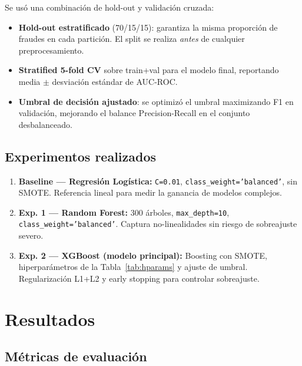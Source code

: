 \documentclass[10pt,twocolumn]{article}
\begin{document}
Se usó una combinación de hold-out y validación cruzada:

\begin{itemize}[leftmargin=*,topsep=2pt,itemsep=1pt]
  \item \textbf{Hold-out estratificado} (70/15/15): garantiza la misma
        proporción de fraudes en cada partición. El split se realiza
        \emph{antes} de cualquier preprocesamiento.
  \item \textbf{Stratified 5-fold CV} sobre train+val para el modelo
        final, reportando media $\pm$ desviación estándar de AUC-ROC.
  \item \textbf{Umbral de decisión ajustado}: se optimizó el umbral
        maximizando F1 en validación, mejorando el balance
        Precision-Recall en el conjunto desbalanceado.
\end{itemize}

\subsection{Experimentos realizados}

\begin{enumerate}[leftmargin=*,topsep=2pt,itemsep=2pt]
  \item \textbf{Baseline — Regresión Logística:} \texttt{C=0.01},
        \texttt{class\_weight='balanced'}, sin SMOTE. Referencia
        lineal para medir la ganancia de modelos complejos.
  \item \textbf{Exp. 1 — Random Forest:} 300 árboles,
        \texttt{max\_depth=10}, \texttt{class\_weight='balanced'}.
        Captura no-linealidades sin riesgo de sobreajuste severo.
  \item \textbf{Exp. 2 — XGBoost (modelo principal):} Boosting con
        SMOTE, hiperparámetros de la Tabla~\ref{tab:hparams} y ajuste
        de umbral. Regularización L1+L2 y early stopping para
        controlar sobreajuste.
\end{enumerate}

\section{Resultados}

\subsection{Métricas de evaluación}
\end{document}
